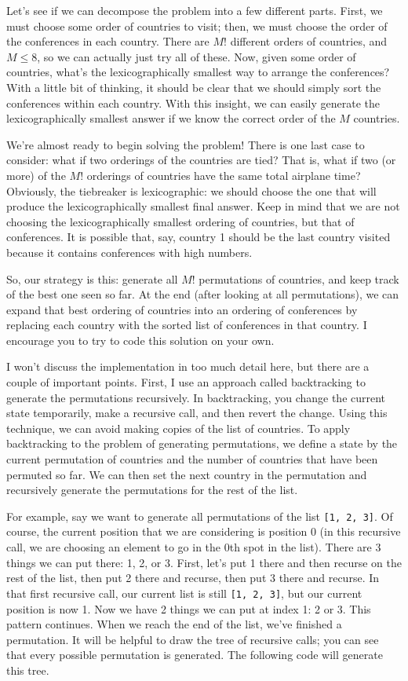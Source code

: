 Let's see if we can decompose the problem into a few different parts. First, we must choose some order of countries to visit; then, we must choose the order of the conferences in each country. There are $M!$ different orders of countries, and $M \leq 8$, so we can actually just try all of these. Now, given some order of countries, what's the lexicographically smallest way to arrange the conferences? With a little bit of thinking, it should be clear that we should simply sort the conferences within each country. With this insight, we can easily generate the lexicographically smallest answer if we know the correct order of the $M$ countries.

We're almost ready to begin solving the problem! There is one last case to consider: what if two orderings of the countries are tied? That is, what if two (or more) of the $M!$ orderings of countries have the same total airplane time? Obviously, the tiebreaker is lexicographic: we should choose the one that will produce the lexicographically smallest final answer. Keep in mind that we are not choosing the lexicographically smallest ordering of countries, but that of conferences. It is possible that, say, country 1 should be the last country visited because it contains conferences with high numbers.

So, our strategy is this: generate all $M!$ permutations of countries, and keep track of the best one seen so far. At the end (after looking at all permutations), we can expand that best ordering of countries into an ordering of conferences by replacing each country with the sorted list of conferences in that country. I encourage you to try to code this solution on your own.

I won't discuss the implementation in too much detail here, but there are a couple of important points. First, I use an approach called backtracking to generate the permutations recursively. In backtracking, you change the current state temporarily, make a recursive call, and then revert the change. Using this technique, we can avoid making copies of the list of countries. To apply backtracking to the problem of generating permutations, we define a state by the current permutation of countries and the number of countries that have been permuted so far. We can then set the next country in the permutation and recursively generate the permutations for the rest of the list.

For example, say we want to generate all permutations of the list \texttt{[1, 2, 3]}. Of course, the current position that we are considering is position 0 (in this recursive call, we are choosing an element to go in the 0th spot in the list). There are 3 things we can put there: 1, 2, or 3. First, let's put 1 there and then recurse on the rest of the list, then put 2 there and recurse, then put 3 there and recurse. In that first recursive call, our current list is still \texttt{[1, 2, 3]}, but our current position is now 1. Now we have 2 things we can put at index 1: 2 or 3. This pattern continues. When we reach the end of the list, we've finished a permutation. It will be helpful to draw the tree of recursive calls; you can see that every possible permutation is generated. The following code will generate this tree.

